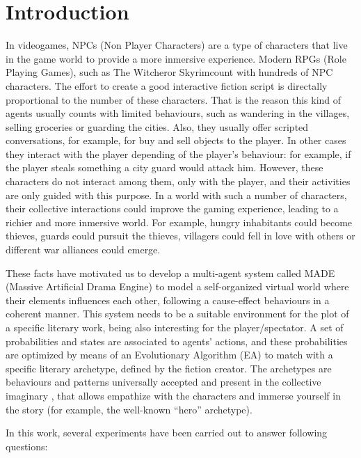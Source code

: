 \documentclass[runningheads]{llncs}
\begin{document}
\section{Introduction}
\noindent 

In videogames, NPCs (Non Player Characters) are a type of characters that live in the game world to provide a more inmersive experience. Modern RPGs (Role Playing Games), such as The Witcher\texttrademark or Skyrim\texttrademark count with hundreds of NPC characters. The effort to create a good interactive fiction script is directally proportional to the number of these characters. That is the reason this kind of agents usually counts with limited behaviours, such as wandering in the villages, selling groceries or guarding the cities. Also, they usually offer scripted conversations, for example, for buy and sell objects to the player. In other cases they interact with the player depending of the player's behaviour: for example, if the player steals something a city guard would attack him.  However, these characters do not interact among them, only with the player, and their activities are only guided with this purpose. In a world with such a number of characters, their collective interactions could improve the gaming experience, leading to a richier and more inmersive world. For example, hungry inhabitants could become thieves, guards could pursuit the thieves, villagers could fell in love with others or different war alliances could emerge.

These facts have motivated us to develop a multi-agent system called MADE (Massive Artificial Drama Engine) to model a self-organized virtual world where their elements influences each other, following a cause-effect behaviours in a coherent manner. This system needs to be a suitable environment for the plot of a specific literary work, being also interesting for the player/spectator. A set of probabilities and states are associated to agents' actions, and these probabilities are optimized by means of an Evolutionary Algorithm (EA) to match with a specific literary archetype, defined by the fiction creator. The archetypes are behaviours and patterns universally accepted and present in the collective imaginary \cite{ArchetypesGarry05}, that allows empathize with the characters and immerse yourself in the story (for example, the well-known ``hero'' archetype).

In this work, several experiments have been carried out to answer following questions: 
\end{document}
